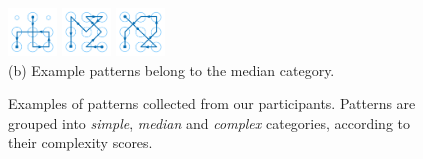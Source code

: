 \begin{figure}[!t]
{\begin{minipage}[b]{8cm}
                \includegraphics[width=1.3cm]{fig/9-8.pdf}
                \hspace{0.1cm}
                \includegraphics[width=1.3cm]{fig/9-9.pdf}
                \hspace{0.1cm}
                \includegraphics[width=1.3cm]{fig/9-10.pdf}\\
                \centering  (b) Example patterns belong to the median category.
                \end{minipage}
            }
            \caption{Examples of patterns collected from our participants. Patterns are grouped into \emph{simple}, \emph{median} and \emph{complex} categories, according to their complexity scores. }
            \label{fig:fig8}
            \vspace{-3mm}
        \end{figure}
    
